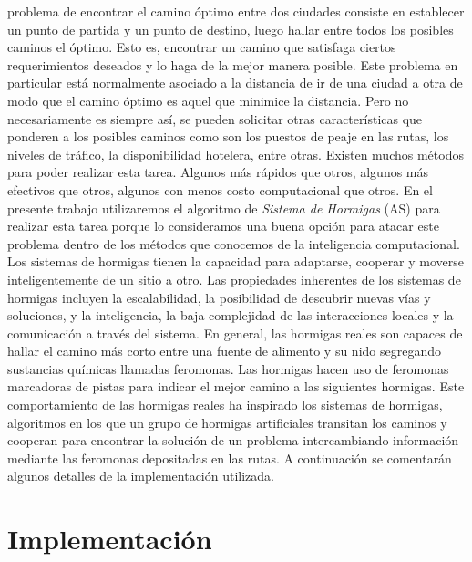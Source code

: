 \documentclass[conference,a4paper,10pt,oneside,final]{tfmpd}
\begin{document}
 problema de encontrar el camino óptimo entre dos ciudades consiste en establecer un punto de partida y un punto de destino, luego hallar entre todos los posibles caminos el óptimo. Esto es, encontrar un camino que satisfaga ciertos requerimientos deseados y lo haga de la mejor manera posible. Este problema en particular está normalmente asociado a la distancia de ir de una ciudad a otra de modo que el camino óptimo es aquel que minimice la distancia. Pero no necesariamente es siempre así, se pueden solicitar otras características que ponderen a los posibles caminos como son los puestos de peaje en las rutas, los niveles de tráfico, la disponibilidad hotelera, entre otras.
Existen muchos métodos para poder realizar esta tarea. Algunos más rápidos que otros, algunos más efectivos que otros, algunos con menos costo computacional que otros. En el presente trabajo utilizaremos el algoritmo de \textit{Sistema de Hormigas} (AS) para realizar esta tarea porque lo consideramos una buena opción para atacar este problema dentro de los métodos que conocemos de la inteligencia computacional.
Los sistemas de hormigas tienen la capacidad para adaptarse, cooperar y moverse  inteligentemente de un sitio a otro. Las propiedades inherentes de los sistemas de hormigas incluyen la escalabilidad, la posibilidad de descubrir nuevas vías y soluciones, y la inteligencia, la baja complejidad de las interacciones locales y la comunicación a través del sistema. En general, las hormigas reales son capaces de hallar el camino más corto entre una fuente de alimento y su nido segregando 
sustancias químicas llamadas feromonas. Las hormigas hacen uso de feromonas marcadoras de pistas para indicar el mejor camino a las siguientes hormigas. Este comportamiento de las hormigas reales ha inspirado los sistemas de hormigas, algoritmos en los 
que un grupo de hormigas artificiales transitan los caminos y cooperan para encontrar la solución de un problema intercambiando información mediante las feromonas depositadas en las rutas. A continuación se comentarán algunos detalles de la implementación utilizada.

\section{Implementación}
\end{document}
